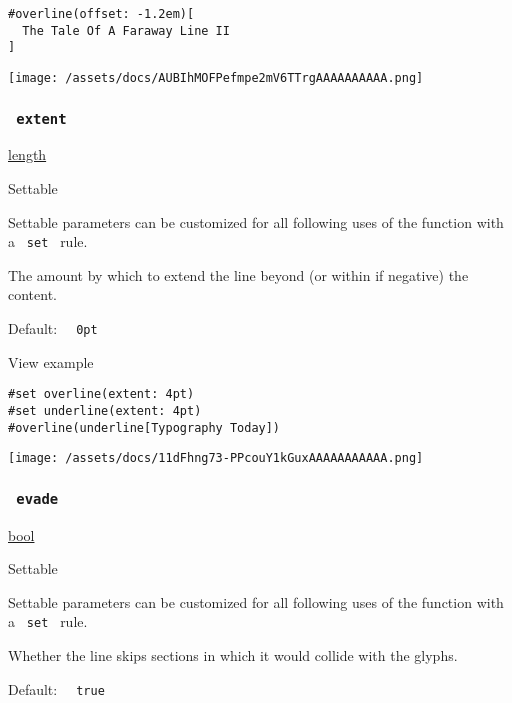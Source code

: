 \begin{verbatim}
#overline(offset: -1.2em)[
  The Tale Of A Faraway Line II
]
\end{verbatim}

\texttt{[image: /assets/docs/AUBIhMOFPefmpe2mV6TTrgAAAAAAAAAA.png]}

\subsubsection{\texorpdfstring{\texttt{\ extent\ }}{ extent }}\label{parameters-extent}

\href{/docs/reference/layout/length/}{length}

{{ Settable }}

\label{parameters-extent-settable-tooltip}
Settable parameters can be customized for all following uses of the
function with a \texttt{\ set\ } rule.

The amount by which to extend the line beyond (or within if negative)
the content.

Default: \texttt{\ }{\texttt{\ 0pt\ }}\texttt{\ }


View example

\begin{verbatim}
#set overline(extent: 4pt)
#set underline(extent: 4pt)
#overline(underline[Typography Today])
\end{verbatim}

\texttt{[image: /assets/docs/11dFhng73-PPcouY1kGuxAAAAAAAAAAA.png]}

\subsubsection{\texorpdfstring{\texttt{\ evade\ }}{ evade }}\label{parameters-evade}

\href{/docs/reference/foundations/bool/}{bool}

{{ Settable }}

\label{parameters-evade-settable-tooltip}
Settable parameters can be customized for all following uses of the
function with a \texttt{\ set\ } rule.

Whether the line skips sections in which it would collide with the
glyphs.

Default: \texttt{\ }{\texttt{\ true\ }}\texttt{\ }

